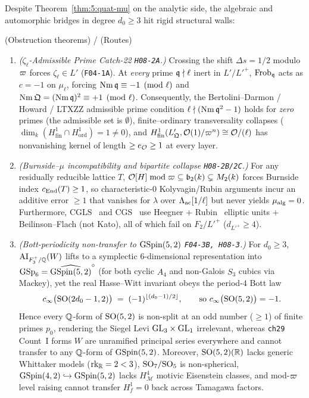 Despite Theorem~\ref{thm:5:quat-mu} on the analytic side, the algebraic and automorphic bridges in degree $d_0 \ge 3$ hit rigid structural walls:

\begin{theorem}\label{thm:5:d3obs}
\tagProved{} \textup{(Obstruction theorems)} / \tagObs{} \textup{(Routes)}
\begin{enumerate}[label=\textup{(\roman*)}]
\item \emph{($\zeta_\ell$-Admissible Prime Catch-22 \texttt{H08-2A}.)} Crossing the shift $\Delta s = 1/2$ modulo $\varpi$ forces $\zeta_\ell \in L'$ (\texttt{F04-1A}). At \emph{every} prime $\mathfrak{q} \nmid \ell$ inert in $L'/L'^+$, $\mathrm{Frob}_{\mathfrak{q}}$ acts as $c = -1$ on $\mu_\ell$, forcing $\operatorname{Nm}\mathfrak{q} \equiv -1 \pmod{\ell}$ and $\operatorname{Nm}\mathfrak{Q} = (\operatorname{Nm}\mathfrak{q})^2 \equiv +1 \pmod{\ell}$. Consequently, the Bertolini--Darmon / Howard / LTXZZ admissible prime condition $\ell \nmid (\operatorname{Nm}\mathfrak{q}^2 - 1)$ holds for \emph{zero} primes (the admissible set is $\emptyset$), finite--ordinary transversality collapses ($\dim_k(H^1_{\mathrm{fin}} \cap H^1_{\mathrm{ord}}) = 1 \neq 0$), and $H^1_{\mathrm{fin}}(L'_{\mathfrak{Q}}, \mathcal{O}(1)/\varpi^n) \cong \mathcal{O}/(\ell)$ has nonvanishing kernel of length $\ge e_{\mathcal{O}} \ge 1$ at every layer.
\item \emph{(Burnside--$\mu$ incompatibility and bipartite collapse \texttt{H08-2B/2C}.)} For any residually reducible lattice $T$, $\mathcal{O}[H] \bmod \varpi \subseteq \mathfrak{b}_2(k) \subsetneq M_2(k)$ forces Burnside index $c_{\mathrm{End}}(T) \ge 1$, so characteristic-$0$ Kolyvagin/Rubin arguments incur an additive error $\ge 1$ that vanishes for $\lambda$ over $\Lambda_{\mathrm{ac}}[1/\ell]$ but never yields $\mu_{\mathrm{alg}} = 0$. Furthermore, CGLS~\cite{CGLS2022} and CGS~\cite{CGS2025} use Heegner + Rubin~\cite{Rubin1991} elliptic units + Beilinson--Flach (not Kato), all of which fail on $F_2/L'^+$ ($d_{L'^+} \ge 4$).
\item \emph{(Bott-periodicity non-transfer to $\mathrm{GSpin}(5,2)$ \texttt{F04-3B, H08-3}.)} For $d_0 \ge 3$, $\mathrm{AI}_{F_3^+/\mathbb{Q}}(W)$ lifts to a symplectic $6$-dimensional representation into $\mathrm{GSp}_6 = \widehat{\mathrm{GSpin}(5,2)}^\circ$ (for both cyclic $A_4$ and non-Galois $S_3$ cubics via Mackey), yet the real Hasse--Witt invariant obeys the period-$4$ Bott law
\[
  c_\infty\bigl(\mathrm{SO}(2d_0-1, 2)\bigr) \;=\; (-1)^{\lfloor (d_0-1)/2 \rfloor}, \qquad\text{so } c_\infty\bigl(\mathrm{SO}(5,2)\bigr) = -1.
\]
Hence every $\mathbb{Q}$-form of $\mathrm{SO}(5,2)$ is non-split at an odd number ($\ge 1$) of finite primes $p_0$, rendering the Siegel Levi $\mathrm{GL}_3 \times \mathrm{GL}_1$ irrelevant, whereas \texttt{ch29} Count~I forms $W$ are unramified principal series everywhere and cannot transfer to any $\mathbb{Q}$-form of $\mathrm{GSpin}(5,2)$. Moreover, $\mathrm{SO}(5,2)(\mathbb{R})$ lacks generic Whittaker models ($\operatorname{rk}_{\mathbb{R}} = 2 < 3$), $\mathrm{SO}_7/\mathrm{SO}_5$ is non-spherical, $\mathrm{GSpin}(4,2) \hookrightarrow \mathrm{GSpin}(5,2)$ lacks $H^4_{\mathcal{M}}$ motivic Eisenstein classes, and mod-$\varpi$ level raising cannot transfer $H^1_f = 0$ back across Tamagawa factors.

\end{enumerate}
\end{theorem}
